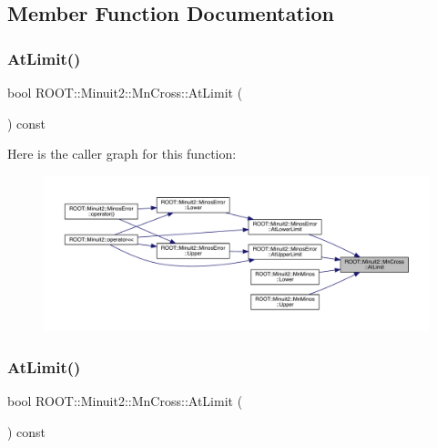 \subsection{Member Function Documentation}
\mbox{\label{classROOT_1_1Minuit2_1_1MnCross_a01119708c6c9aa2a5b16222705cad954}} 
\subsubsection{\texorpdfstring{AtLimit()}{AtLimit()}\hspace{0.1cm}{\footnotesize\ttfamily [1/3]}}
{\footnotesize\ttfamily bool R\+O\+O\+T\+::\+Minuit2\+::\+Mn\+Cross\+::\+At\+Limit (\begin{DoxyParamCaption}{ }\end{DoxyParamCaption}) const\hspace{0.3cm}{\ttfamily [inline]}}

Here is the caller graph for this function\+:
\nopagebreak
\begin{figure}[H]
\begin{center}
\leavevmode
\includegraphics[width=350pt]{d3/db2/classROOT_1_1Minuit2_1_1MnCross_a01119708c6c9aa2a5b16222705cad954_icgraph}
\end{center}
\end{figure}
\mbox{\label{classROOT_1_1Minuit2_1_1MnCross_a01119708c6c9aa2a5b16222705cad954}} 
\subsubsection{\texorpdfstring{AtLimit()}{AtLimit()}\hspace{0.1cm}{\footnotesize\ttfamily [2/3]}}
{\footnotesize\ttfamily bool R\+O\+O\+T\+::\+Minuit2\+::\+Mn\+Cross\+::\+At\+Limit (\begin{DoxyParamCaption}{ }\end{DoxyParamCaption}) const\hspace{0.3cm}{\ttfamily [inline]}}

